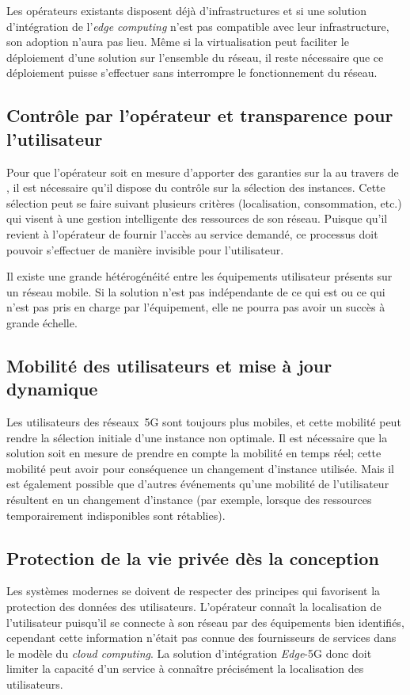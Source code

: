 \documentclass[../main.tex]{subfiles}
\begin{document}
Les opérateurs existants disposent déjà d’infrastructures et si une solution d’intégration de l’\textit{edge computing} n’est pas compatible avec leur infrastructure, son adoption n’aura pas lieu.
Même si la virtualisation peut faciliter le déploiement d’une solution sur l’ensemble du réseau, il reste nécessaire que ce déploiement puisse s’effectuer sans interrompre le fonctionnement du réseau.

\subsection{Contrôle par l’opérateur et transparence pour l'utilisateur}
Pour que l’opérateur soit en mesure d’apporter des garanties sur la  au travers de , il est nécessaire qu’il dispose du contrôle sur la sélection des instances.
Cette sélection peut se faire suivant plusieurs critères (localisation, consommation, etc.) qui visent à une gestion intelligente des ressources de son réseau.
Puisque qu’il revient à l’opérateur de fournir l’accès au service demandé, ce processus doit pouvoir s’effectuer de manière invisible pour l’utilisateur.

Il existe une grande hétérogénéité entre les équipements utilisateur présents sur un réseau mobile.
Si la solution n’est pas indépendante de ce qui est ou ce qui n’est pas pris en charge par l’équipement, elle ne pourra pas avoir un succès à grande échelle. 

\subsection{Mobilité des utilisateurs et mise à jour dynamique}
Les utilisateurs des réseaux~5G sont toujours plus mobiles, et cette mobilité peut rendre la sélection initiale d’une instance non optimale.
Il est nécessaire que la solution soit en mesure de prendre en compte la mobilité en temps réel; cette mobilité peut avoir pour conséquence un changement d’instance utilisée.
Mais il est également possible que d’autres événements qu’une mobilité de l’utilisateur résultent en un changement d’instance 
(par exemple, lorsque des ressources temporairement indisponibles sont rétablies).

\subsection{Protection de la vie privée dès la conception}
Les systèmes modernes se doivent de respecter des principes qui favorisent la protection des données des utilisateurs.
L’opérateur connaît la localisation de l’utilisateur puisqu’il se connecte à son réseau par des équipements bien identifiés, cependant cette information n’était pas connue des fournisseurs de services dans le modèle du \textit{cloud computing}.
La solution d’intégration \textit{Edge}-5G donc doit limiter la capacité d’un service à connaître précisément la localisation des utilisateurs.
\end{document}
